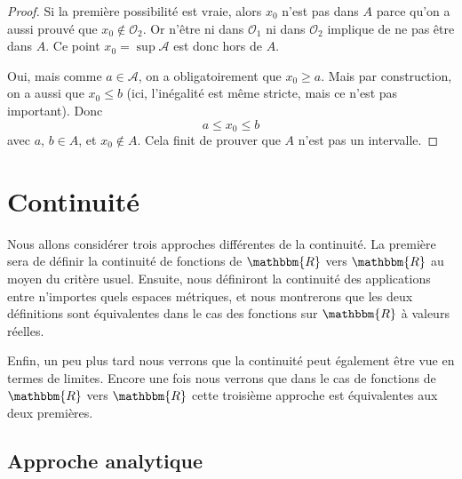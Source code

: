 \documentclass[a4paper,12pt]{book}
\newcommand{\eR}{\mathbbm{R}}
\theoremstyle{mes_exemples}	\newtheorem{exemple}[numtho]{Exemple}
\theoremstyle{mes_tho}
\newcommand{\mA}{\mathcal{A}}
\newcommand{\mO}{\mathcal{O}}
\begin{document}
\begin{proof}
	Si la première possibilité est vraie, alors $x_0$ n'est pas dans $A$ parce qu'on a aussi prouvé que $x_0\notin\mO_2$. Or n'être ni dans $\mO_1$ ni dans $\mO_2$ implique de ne pas être dans $A$. Ce point $x_0=\sup\mA$ est donc hors de $A$.

	Oui, mais comme $a\in\mA$, on a obligatoirement que $x_0\geq a$. Mais par construction, on a aussi que $x_0\leq b$ (ici, l'inégalité est même stricte, mais ce n'est pas important). Donc
	\[ 
	  a\leq x_0\leq b
	\]
	avec $a$, $b\in A$, et $x_0\notin A$. Cela finit de prouver que $A$ n'est pas un intervalle.
\end{proof}



\section{Continuité}

Nous allons considérer trois approches différentes de la continuité. La première sera de définir la continuité de fonctions de $\eR$ vers $\eR$ au moyen du critère usuel. Ensuite, nous définiront la continuité des applications entre n'importes quels espaces métriques, et nous montrerons que les deux définitions sont équivalentes dans le cas des fonctions sur $\eR$ à valeurs réelles.

Enfin, un peu plus tard nous verrons que la continuité peut également être vue en termes de limites. Encore une fois nous verrons que dans le cas de fonctions de $\eR$ vers $\eR$ cette troisième approche est équivalentes aux deux premières.

\subsection{Approche analytique}
\end{document}
